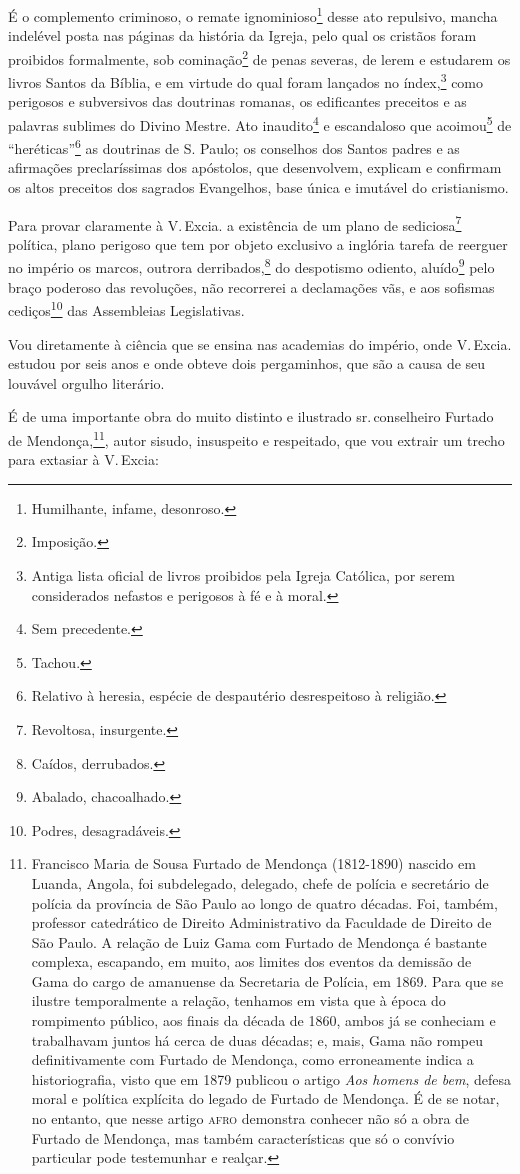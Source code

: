 É o complemento criminoso, o remate ignominioso\footnote{Humilhante,
  infame, desonroso.} desse ato repulsivo, mancha indelével posta nas
páginas da história da Igreja, pelo qual os cristãos foram proibidos
formalmente, sob cominação\footnote{Imposição.} de penas severas, de
lerem e estudarem os livros Santos da Bíblia, e em virtude do qual foram
lançados no índex,\footnote{Antiga lista oficial de livros proibidos
  pela Igreja Católica, por serem considerados nefastos e perigosos à fé
  e à moral.} como perigosos e subversivos das doutrinas romanas, os
edificantes preceitos e as palavras sublimes do Divino Mestre. Ato
inaudito\footnote{Sem precedente.} e escandaloso que
acoimou\footnote{Tachou.} de ``heréticas''\footnote{Relativo à heresia,
  espécie de despautério desrespeitoso à religião.} as doutrinas de S.
Paulo; os conselhos dos Santos padres e as afirmações preclaríssimas dos
apóstolos, que desenvolvem, explicam e confirmam os altos preceitos dos
sagrados Evangelhos, base única e imutável do cristianismo.

Para provar claramente à V.\,Excia. a existência de um plano de
sediciosa\footnote{Revoltosa, insurgente.} política, plano perigoso
que tem por objeto exclusivo a inglória tarefa de reerguer no império os
marcos, outrora derribados,\footnote{Caídos, derrubados.} do
despotismo odiento, aluído\footnote{Abalado, chacoalhado.} pelo braço
poderoso das revoluções, não recorrerei a declamações vãs, e aos
sofismas cediços\footnote{Podres, desagradáveis.} das Assembleias
Legislativas.

Vou diretamente à ciência que se ensina nas academias do império, onde
V.\,Excia. estudou por seis anos e onde obteve dois pergaminhos, que são
a causa de seu louvável orgulho literário.

É de uma importante obra do muito distinto e ilustrado sr.\,conselheiro
Furtado de Mendonça,\footnote{Francisco Maria de Sousa Furtado de
  Mendonça (1812-1890) nascido em Luanda, Angola, foi subdelegado,
  delegado, chefe de polícia e secretário de polícia da província de São
  Paulo ao longo de quatro décadas. Foi, também, professor catedrático
  de Direito Administrativo da Faculdade de Direito de São Paulo. A
  relação de Luiz Gama com Furtado de Mendonça é bastante complexa,
  escapando, em muito, aos limites dos eventos da demissão de Gama do
  cargo de amanuense da Secretaria de Polícia, em 1869. Para que se
  ilustre temporalmente a relação, tenhamos em vista que à época do
  rompimento público, aos finais da década de 1860, ambos já se
  conheciam e trabalhavam juntos há cerca de duas décadas; e, mais, Gama
  não rompeu definitivamente com Furtado de Mendonça, como erroneamente
  indica a historiografia, visto que em 1879 publicou o artigo \emph{Aos
  homens de bem}, defesa moral e política explícita do legado de Furtado
  de Mendonça. É de se notar, no entanto, que nesse artigo \textsc{afro}
  demonstra conhecer não só a obra de Furtado de Mendonça, mas também
  características que só o convívio particular pode testemunhar e
  realçar.}, autor sisudo, insuspeito e respeitado, que vou extrair um
trecho para extasiar à V.\,Excia:

